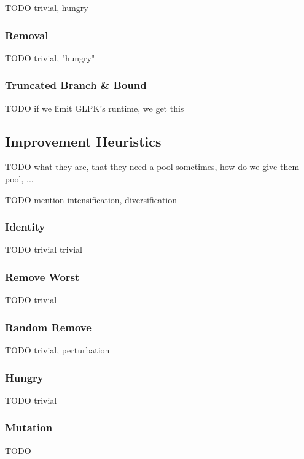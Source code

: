 \documentclass[a4paper,12pt,oneside]{report}
\begin{document}
TODO trivial, hungry

\subsubsection{Removal}

TODO trivial, "hungry"

\subsubsection{Truncated Branch \& Bound}

TODO if we limit GLPK's runtime, we get this 

\subsection{Improvement Heuristics}


TODO what they are, that they need a pool sometimes, how do we give them pool, ...

TODO mention intensification, diversification

\subsubsection{Identity}

TODO trivial trivial

\subsubsection{Remove Worst}

TODO trivial

\subsubsection{Random Remove}

TODO trivial, perturbation

\subsubsection{Hungry}

TODO trivial

\subsubsection{Mutation}

TODO
\end{document}
